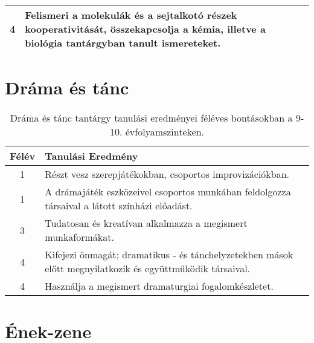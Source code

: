 \begin{longtable}{c | p{} }
                                
                                          4 &  Felismeri a molekulák és a sejtalkotó részek kooperativitását, összekapcsolja  a kémia, illetve a biológia tantárgyban tanult ismereteket. \\ \hline
                                      
                        \end{longtable}
            \clearpage

        \section{Dráma és tánc}

       
           \begin{longtable}{c | p{} }
            \caption[Dráma és tánc 9-10.]{Dráma és tánc tantárgy tanulási eredményei féléves bontásokban a 9-10. évfolyamszinteken. }  \\

            \textbf{Félév} & \textbf{Tanulási Eredmény} \\
            \hline
            \endhead
                                
                                          1 &  Részt vesz szerepjátékokban, csoportos improvizációkban. \\ \hline
                                          1 &  A drámajáték eszközeivel csoportos munkában feldolgozza társaival a látott színházi előadást. \\ \hline
                                      
                                
                                          3 &  Tudatosan és kreatívan alkalmazza a megismert munkaformákat. \\ \hline
                                      
                                
                                          4 &  Kifejezi önmagát; dramatikus - és tánchelyzetekben mások előtt megnyilatkozik és együttműködik társaival. \\ \hline
                                          4 &  Használja a megismert dramaturgiai fogalomkészletet. \\ \hline
                                      
                        \end{longtable}
            \clearpage

        \section{Ének-zene}

